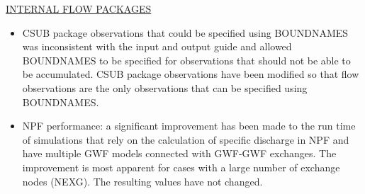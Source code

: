 \underline{INTERNAL FLOW PACKAGES}
\begin{itemize}
	\item CSUB package observations that could be specified using BOUNDNAMES was inconsistent with the input and output guide and allowed BOUNDNAMES to be specified for observations that should not be able to be accumulated. CSUB package observations have been modified so that flow observations are the only observations that can be specified using BOUNDNAMES.
	\item NPF performance: a significant improvement has been made to the run time of simulations that rely on the calculation of specific discharge in NPF and have multiple GWF models connected with GWF-GWF exchanges. The improvement is most apparent for cases with a large number of exchange nodes (NEXG). The resulting values have not changed.
\end{itemize}






